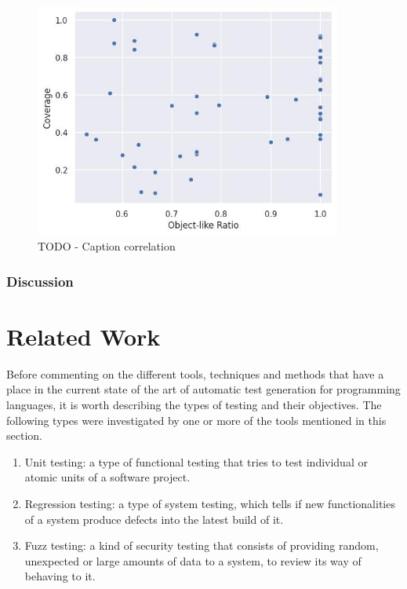 \documentclass[%
  chapterprefix=false,%
  open=right,%
  twoside=true,%
  paper=a4,%
  logofile={Figures/logo.png},%
  thesistype=master,%
  UKenglish,%
]{se2thesis}
\begin{document}
\begin{figure}[bth]
  \centering
  \includegraphics[width=0.9\textwidth]{Figures/Results/scatterplot.jpg}
  \caption{TODO - Caption correlation}\label{fig:scatter}
\end{figure}

\subsection*{Discussion} 


\chapter{Related Work}\label{chap:related_work}


Before commenting on the different tools, techniques and methods that have a place in the current state of the art of automatic test generation for programming languages, it is worth describing the types of testing and their objectives. The following types were investigated by one or more of the tools mentioned in this section. 

\begin{enumerate}
  \item Unit testing: a type of functional testing that tries to test individual or atomic units of a software project.
  \item Regression testing: a type of system testing, which tells if new functionalities of a system produce defects into the latest build of it.
  \item Fuzz testing: a kind of security testing that consists of providing random, unexpected or large amounts of data to a system, to review its way of behaving to it.
\end{enumerate}
\end{document}
